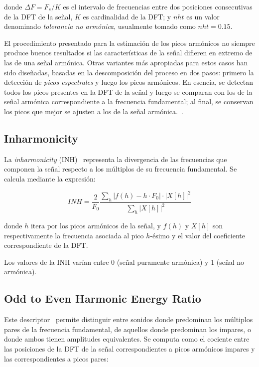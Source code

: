 \noindent
donde $\Delta F = F_{s}/K$ es el intervalo de frecuencias entre dos posiciones consecutivas de la DFT de la señal, $K$ es cardinalidad de la DFT;
y $nht$ es un valor denominado \textit{tolerancia no armónica}, usualmente tomado como $nht = 0.15$.

El procedimiento presentado para la estimación de los picos armónicos no siempre produce buenos resultados si las características de la señal difieren en extremo de las de una señal armónica.
Otras variantes más apropiadas para estos casos han sido diseñadas, basadas en la descomposición del proceso en dos pasos: primero la detección de \textit{picos espectrales} y luego los picos armónicos.
En esencia, se detectan todos los picos presentes en la DFT de la señal y luego se comparan con los de la señal armónica correspondiente a la frecuencia fundamental;
al final, se conservan los picos que mejor se ajusten a los de la señal armónica.~\cite{Kim05}.

\subsection{Inharmonicity}\label{subsec:inharmonicity}

La \textit{inharmonicity} (INH)~\cite{Peters04,Zamanian17} representa la divergencia de las frecuencias que componen la señal respecto a los múltiplos de su frecuencia fundamental.
Se calcula mediante la expresión:

\begin{equation}
    \label{eq:INH}
    INH = \frac{2}{F_0} \frac{\sum_{h}{|f(h) - h\cdot F_0|\cdot |X[h]|^2}}{\sum_{h}{|X[h]|^2}}
\end{equation}

\noindent
donde $h$ itera por los picos armónicos de la señal, y $f(h)$ y $X[h]$ son respectivamente la frecuencia asociada al pico $h$-ésimo y el valor del coeficiente correspondiente de la DFT\@.

Los valores de la INH varían entre 0 (señal puramente armónica) y 1 (señal no armónica).

\subsection{Odd to Even Harmonic Energy Ratio}\label{subsec:oddToEvenHarmonicEnergyRatio}

Este descriptor~\cite{Peters04,Gunasekaran11} permite distinguir entre sonidos donde predominan los múltiplos pares de la frecuencia fundamental, de aquellos donde predominan los impares, o donde ambos tienen amplitudes equivalentes.
Se computa como el cociente entre las posiciones de la DFT de la señal correspondientes a picos armónicos impares y las correspondientes a picos pares:

